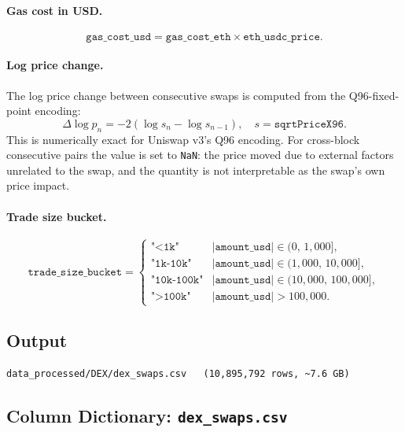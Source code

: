 \documentclass[11pt,a4paper]{article}
\begin{document}
\paragraph{Gas cost in USD.}
\[
  \texttt{gas\_cost\_usd} = \texttt{gas\_cost\_eth} \times
  \texttt{eth\_usdc\_price}.
\]

\paragraph{Log price change.}
The log price change between consecutive swaps is computed from the
Q96-fixed-point encoding:
\[
  \Delta\log p_n = -2(\log s_n - \log s_{n-1}),
  \quad s = \texttt{sqrtPriceX96}.
\]
This is numerically exact for Uniswap v3's Q96 encoding. For cross-block
consecutive pairs the value is set to \texttt{NaN}: the price moved due
to external factors unrelated to the swap, and the quantity is not
interpretable as the swap's own price impact.

\paragraph{Trade size bucket.}
\[
  \texttt{trade\_size\_bucket} = \begin{cases}
    \texttt{"<1k"}      & |\texttt{amount\_usd}| \in (0,\,1{,}000], \\
    \texttt{"1k-10k"}   & |\texttt{amount\_usd}| \in (1{,}000,\,10{,}000], \\
    \texttt{"10k-100k"} & |\texttt{amount\_usd}| \in (10{,}000,\,100{,}000], \\
    \texttt{">100k"}    & |\texttt{amount\_usd}| > 100{,}000.
  \end{cases}
\]

\subsection{Output}

\begin{lstlisting}
data_processed/DEX/dex_swaps.csv   (10,895,792 rows, ~7.6 GB)
\end{lstlisting}

\subsection{Column Dictionary: \texttt{dex\_swaps.csv}}
\end{document}
